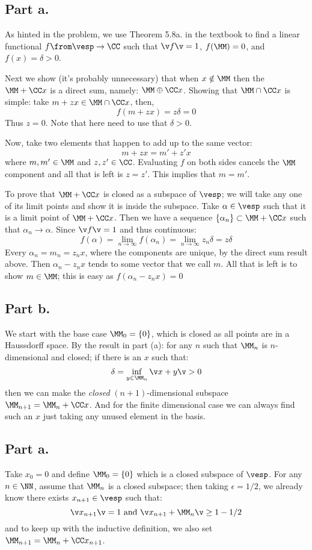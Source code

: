 \subsection*{Part \textbf{a.}}
As hinted in the problem, we use Theorem 5.8a. in the textbook to find a linear functional $f\from \vesp \to \CC$ such that $\v f\v=1$, $f(\MM)=0$, and $f(x)=\delta>0$.

Next we show (it's probably unnecessary) that when $x\notin \MM$ then the $\MM + \CC x$ is a direct sum, namely: $\MM \oplus \CC x$. 
Showing that $\MM\cap \CC x$ is simple: take $m+zx\in \MM \cap \CC x$, then, 
$$f(m+zx)=z\delta =0$$
Thus $z=0$. Note that here need to use that $\delta>0$.

Now, take two elements that happen to add up to the same vector:
$$m+zx = m'+z' x$$
where $m,m' \in \MM$ and $z,z'\in \CC$. 
Evaluating $f$ on both sides cancels the $\MM$ component and all that is left is $z=z'$. 
This implies that $m=m'$.

To prove that $\MM+\CC x$ is closed as a subspace of $\vesp$; we will take any one of its limit points and show it is inside the subspace.
Take $\alpha \in \vesp$ such that it is a limit point of $\MM+\CC x$.
Then we have a sequence $\{\alpha_n \}\subset \MM+\CC x$ such that $\alpha_n \to \alpha$.
Since $\v f\v=1$ and thus continuous:
$$f(\alpha) = \lim_{n\to \infty} f(\alpha_n)= \lim_{n\to \infty} z_n \delta = z\delta$$
Every $\alpha_n = m_n = z_n x$, where the components are unique, by the direct sum result above. 
Then $\alpha_n - z_n x$ tends to some vector that we call $m$. 
All that is left is to show $m\in \MM$; this is easy as $f(\alpha_n - z_n x) =0$

\subsection*{Part \textbf{b.}}
We start with the base case $\MM_0 =\{0\}$, which is closed as all points are in a Haussdorff space.
By the result in part (a): for any $n$ such that $\MM_n$ is $n$-dimensional and closed; if there is an $x$ such that:
$$\delta=\inf_{y\in \MM_n}\v x+y\v>0$$
then we can make the \emph{closed} $(n+1)$-dimensional subspace $\MM_{n+1}=\MM_n + \CC x$. 
And for the finite dimensional case we can always find such an $x$ just taking any unused element in the basis.

\subsection*{Part \textbf{a.}}
Take $x_0=0 $ and define $\MM_0= \{0\}$ which is a closed subspace of $\vesp$.
For any $n\in \NN$, assume that $\MM_{n} $ is a closed subspace; then taking $\epsilon = 1/2$, we already know there
exists $x_{n+1}\in \vesp$ such that:
$$\v x_{n+1}\v = 1 \text{ and } \v x_{n+1} + \MM_n \v \geq 1-1/2$$
and to keep up with the inductive definition, we also set $\MM_{n+1} = \MM_n+\CC x_{n+1}$.

